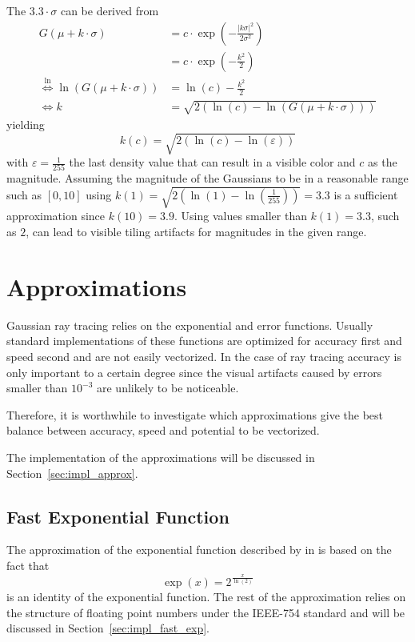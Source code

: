 \documentclass[a4paper, 11pt]{memoir}
\begin{document}
    The $3.3 \cdot \sigma$ can be derived from
    \begin{align}
        G(\mu + k \cdot \sigma) &= c \cdot \exp{\left(-\frac{|k \sigma|^2}{2\sigma^2}\right)}\\
        &= c \cdot \exp{\left(-\frac{k^2}{2}\right)}\\
        \overset{\ln}{\iff} \ln{\left( G(\mu + k\cdot\sigma) \right)} &= \ln{(c)} - \frac{k^2}{2}\\
        \iff k &= \sqrt{2\left(\ln{(c)} - \ln{\left( G(\mu + k\cdot\sigma) \right)}\right)}
    \end{align}
    yielding
    \begin{equation}
        k(c) = \sqrt{2(\ln{(c)} - \ln{(\varepsilon)})}
        \label{eq:sig_lim}
    \end{equation}
    with $\varepsilon = \frac{1}{255}$ the last density value that can result in a visible color and $c$ as the
    magnitude. Assuming the magnitude of the Gaussians to be in a reasonable range such as $[0, 10]$ using $k(1) =
    \sqrt{2(\ln{(1)} - \ln{(\frac{1}{255})})} = 3.3$ is a sufficient approximation since $k(10) = 3.9$. Using values
    smaller than $k(1) = 3.3$, such as $2$, can lead to visible tiling artifacts for magnitudes in the given range.

    \chapter{Approximations}
    \label{ch:approximations}
    Gaussian ray tracing relies on the exponential and error functions. Usually standard implementations of these
    functions are optimized for accuracy first and speed second and are not easily vectorized. In the case of ray
    tracing accuracy is only important to a certain degree since the visual artifacts caused by errors smaller than
    $10^{-3}$ are unlikely to be noticeable.

    Therefore, it is worthwhile to investigate which approximations give the best balance between accuracy, speed and
    potential to be vectorized.

    The implementation of the approximations will be discussed in Section~\ref{sec:impl_approx}.

    \section{Fast Exponential Function}
    \label{sec:fast_exp}
    The approximation of the exponential function described by \citeauthor{fast_exp} in 
    \cite{fast_exp} is based on the fact that
    \begin{equation}
        \exp{(x)} = 2^{\frac{x}{\ln{(2)}}}
        \label{eq:exp_ident}
    \end{equation}
    is an identity of the exponential function. The rest of the approximation relies on the structure of floating point
    numbers under the IEEE-754 standard and will be discussed in Section~\ref{sec:impl_fast_exp}.
    
\end{document}
